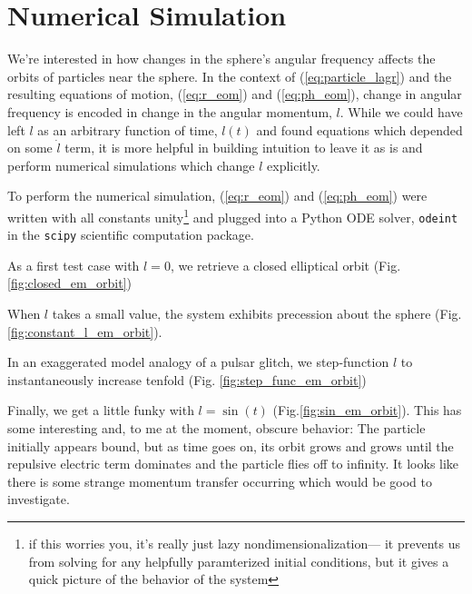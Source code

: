 \documentclass[11pt]{article}
\begin{document}
\section{Numerical Simulation}
We're interested in how changes in the sphere's angular frequency affects the orbits of particles near the sphere.  In the context of (\ref{eq:particle_lagr}) and the resulting equations of motion, (\ref{eq:r_eom}) and (\ref{eq:ph_eom}), change in angular frequency is encoded in change in the angular momentum, $l$.  While we could have left $l$ as an arbitrary function of time, $l(t)$ and found equations which depended on some $\dot{l}$ term, it is more helpful in building intuition to leave it as is and perform numerical simulations which change $l$ explicitly.

To perform the numerical simulation, (\ref{eq:r_eom}) and (\ref{eq:ph_eom}) were written with all constants unity\footnote{if this worries you, it's really just lazy nondimensionalization--- it prevents us from solving for any helpfully paramterized initial conditions, but it gives a quick picture of the behavior of the system} and plugged into a Python ODE solver, \texttt{odeint} in the \texttt{scipy} scientific computation package.



As a first test case with $l = 0$, we retrieve a closed elliptical orbit (Fig.\ref{fig:closed_em_orbit})


When $l$ takes a small value, the system exhibits precession about the sphere (Fig. \ref{fig:constant_l_em_orbit}).




In an exaggerated model analogy of a pulsar glitch, we step-function $l$ to instantaneously increase tenfold (Fig. \ref{fig:step_func_em_orbit})


Finally, we get a little funky with $l = \sin(t)$ (Fig.\ref{fig:sin_em_orbit}).  This has some interesting and, to me at the moment, obscure behavior:  The particle initially appears bound, but as time goes on, its orbit grows and grows until the repulsive electric term dominates and the particle flies off to infinity.  It looks like there is some strange momentum transfer occurring which would be good to investigate.
\end{document}
